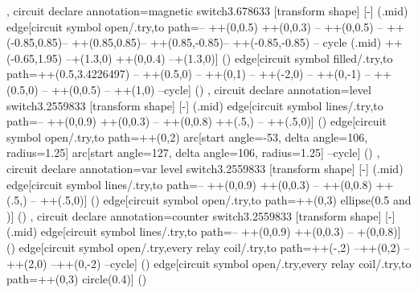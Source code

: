 {{  },
  circuit declare annotation={magnetic switch}{3.678633\tikzcircuitssizeunit}
  {
    [transform shape]
    [-]
    (\tikzlastnode.mid) edge[circuit symbol open/.try,to path={-- ++(0,0.5\tikzcircuitssizeunit) ++(0,0.3\tikzcircuitssizeunit) -- ++(0,0.5\tikzcircuitssizeunit) -- ++(-0.85\tikzcircuitssizeunit,0.85\tikzcircuitssizeunit)-- ++(0.85\tikzcircuitssizeunit,0.85\tikzcircuitssizeunit)-- ++(0.85\tikzcircuitssizeunit,-0.85\tikzcircuitssizeunit)-- ++(-0.85\tikzcircuitssizeunit,-0.85\tikzcircuitssizeunit) -- cycle (\tikzlastnode.mid) ++(-0.65\tikzcircuitssizeunit,1.95\tikzcircuitssizeunit) --+(1.3\tikzcircuitssizeunit,0) ++(0,0.4\tikzcircuitssizeunit) --+(1.3\tikzcircuitssizeunit,0)}] () edge[circuit symbol filled/.try,to path={++(0.5\tikzcircuitssizeunit,3.4226497\tikzcircuitssizeunit) -- ++(0.5\tikzcircuitssizeunit,0) -- ++(0,1\tikzcircuitssizeunit) -- ++(-2\tikzcircuitssizeunit,0) -- ++(0,-1\tikzcircuitssizeunit) -- ++(0.5\tikzcircuitssizeunit,0) -- ++(0,0.5\tikzcircuitssizeunit) -- ++(1\tikzcircuitssizeunit,0) --cycle}] ()
  },
  circuit declare annotation={level switch}{3.2559833\tikzcircuitssizeunit}
  {
    [transform shape]
    [-]
    (\tikzlastnode.mid) edge[circuit symbol lines/.try,to path={-- ++(0,0.9\tikzcircuitssizeunit) ++(0,0.3\tikzcircuitssizeunit) -- ++(0,0.8\tikzcircuitssizeunit) ++(.5\tikzcircuitssizeunit,\tikzcircuitssizeunit) -- ++(.5\tikzcircuitssizeunit,0)}] () edge[circuit symbol open/.try,to path={++(0,2\tikzcircuitssizeunit) arc[start angle=-53, delta angle=106, radius=1.25\tikzcircuitssizeunit] arc[start angle=127, delta angle=106, radius=1.25\tikzcircuitssizeunit] --cycle}] ()
  },
  circuit declare annotation={var level switch}{3.2559833\tikzcircuitssizeunit}
  {
    [transform shape]
    [-]
    (\tikzlastnode.mid) edge[circuit symbol lines/.try,to path={-- ++(0,0.9\tikzcircuitssizeunit) ++(0,0.3\tikzcircuitssizeunit) -- ++(0,0.8\tikzcircuitssizeunit) ++(.5\tikzcircuitssizeunit,\tikzcircuitssizeunit) -- ++(.5\tikzcircuitssizeunit,0)}] () edge[circuit symbol open/.try,to path={++(0,3\tikzcircuitssizeunit) ellipse({0.5\tikzcircuitssizeunit} and {\tikzcircuitssizeunit})}] ()
  },
  circuit declare annotation={counter switch}{3.2559833\tikzcircuitssizeunit}
  {
    [transform shape]
    [-]
    (\tikzlastnode.mid) edge[circuit symbol lines/.try,to path={-- ++(0,0.9\tikzcircuitssizeunit) ++(0,0.3\tikzcircuitssizeunit) -- +(0,0.8\tikzcircuitssizeunit)}] () edge[circuit symbol open/.try,every relay coil/.try,to path={++(-\tikzcircuitssizeunit,2\tikzcircuitssizeunit) --++(0,2\tikzcircuitssizeunit) -- ++(2\tikzcircuitssizeunit,0) --++(0,-2\tikzcircuitssizeunit) --cycle}] () edge[circuit symbol open/.try,every relay coil/.try,to path={++(0,3\tikzcircuitssizeunit)  circle(0.4\tikzcircuitssizeunit)}] ()
}}
